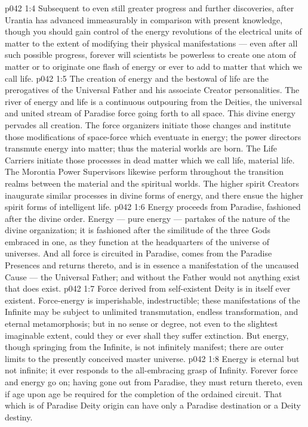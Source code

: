 \vs p042 1:4 Subsequent to even still greater progress and further discoveries, after Urantia has advanced immeasurably in comparison with present knowledge, though you should gain control of the energy revolutions of the electrical units of matter to the extent of modifying their physical manifestations --- even after all such possible progress, forever will scientists be powerless to create one atom of matter or to originate one flash of energy or ever to add to matter that which we call life.
\vs p042 1:5 \pc The creation of energy and the bestowal of life are the prerogatives of the Universal Father and his associate Creator personalities. The river of energy and life is a continuous outpouring from the Deities, the universal and united stream of Paradise force going forth to all space. This divine energy pervades all creation. The force organizers initiate those changes and institute those modifications of space\hyp{}force which eventuate in energy; the power directors transmute energy into matter; thus the material worlds are born. The Life Carriers initiate those processes in dead matter which we call life, material life. The Morontia Power Supervisors likewise perform throughout the transition realms between the material and the spiritual worlds. The higher spirit Creators inaugurate similar processes in divine forms of energy, and there ensue the higher spirit forms of intelligent life.
\vs p042 1:6 \pc Energy proceeds from Paradise, fashioned after the divine order. Energy --- pure energy --- partakes of the nature of the divine organization; it is fashioned after the similitude of the three Gods embraced in one, as they function at the headquarters of the universe of universes. And all force is circuited in Paradise, comes from the Paradise Presences and returns thereto, and is in essence a manifestation of the uncaused Cause --- the Universal Father; and without the Father would not anything exist that does exist.
\vs p042 1:7 Force derived from self\hyp{}existent Deity is in itself ever existent. Force\hyp{}energy is imperishable, indestructible; these manifestations of the Infinite may be subject to unlimited transmutation, endless transformation, and eternal metamorphosis; but in no sense or degree, not even to the slightest imaginable extent, could they or ever shall they suffer extinction. But energy, though springing from the Infinite, is not infinitely manifest; there are outer limits to the presently conceived master universe.
\vs p042 1:8 Energy is eternal but not infinite; it ever responds to the all\hyp{}embracing grasp of Infinity. Forever force and energy go on; having gone out from Paradise, they must return thereto, even if age upon age be required for the completion of the ordained circuit. That which is of Paradise Deity origin can have only a Paradise destination or a Deity destiny.
